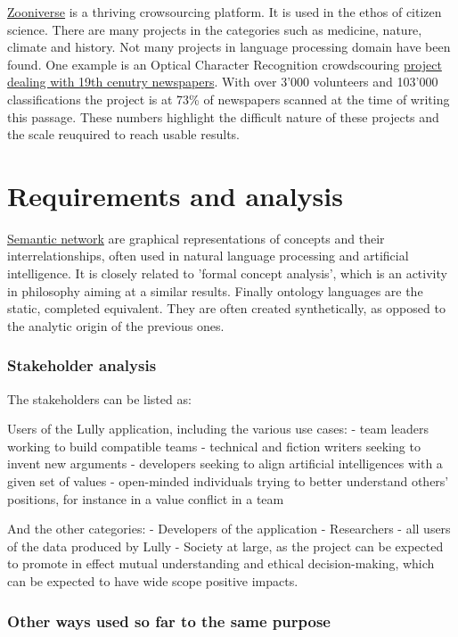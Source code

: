 \documentclass{article}
\begin{document}
\href{https://www.zooniverse.org/projects}{Zooniverse} is a thriving crowsourcing platform. It is used in the ethos of citizen science. There are many projects in the categories such as medicine, nature, climate and history.  Not many projects in language processing domain have been found. One example is an Optical Character Recognition crowdscouring \href{https://www.zooniverse.org/projects/bldigital/living-with-machines}{project dealing with 19th cenutry newspapers}. With over 3'000 volunteers and 103'000 classifications the project is at 73\% of newspapers scanned at the time of writing this passage.
These numbers highlight the difficult nature of these projects and the scale reuquired to reach usable results.

\newpage

\chapter{Requirements and analysis}
\href{https://en.wikipedia.org/wiki/Semantic_network}{Semantic network} are graphical representations of concepts and their interrelationships, often used in natural language processing and artificial intelligence. It is closely related to 'formal concept analysis', which is an activity in philosophy aiming at a similar results. Finally ontology languages are the static, completed equivalent. They are often created synthetically, as opposed to the analytic origin of the previous ones.

\subsection{Stakeholder analysis}
The stakeholders can be listed as:

Users of the Lully application, including the various use cases:
- team leaders working to build compatible teams
- technical and fiction writers seeking to invent new arguments
- developers seeking to align artificial intelligences with a given set of values 
- open-minded individuals trying to better understand others' positions, for instance in a value conflict in a team

And the other categories:
- Developers of the application 
- Researchers - all users of the data produced by Lully
- Society at large, as the project can be expected to promote in effect mutual understanding and ethical decision-making, which can be expected to have wide scope positive impacts.

\subsection{Other ways used so far to the same purpose}
\end{document}
